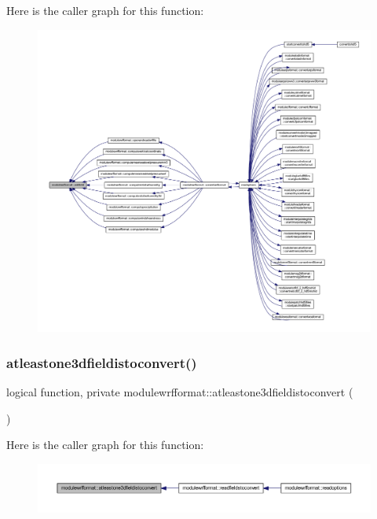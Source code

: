 Here is the caller graph for this function\+:\nopagebreak
\begin{figure}[H]
\begin{center}
\leavevmode
\includegraphics[width=350pt]{namespacemodulewrfformat_a4fec880c8102aff05f702538868fa928_icgraph}
\end{center}
\end{figure}
\mbox{\label{namespacemodulewrfformat_a84c66dd2bcabd5f772f74e52544536f7}} 
\subsubsection{\texorpdfstring{atleastone3dfieldistoconvert()}{atleastone3dfieldistoconvert()}}
{\footnotesize\ttfamily logical function, private modulewrfformat\+::atleastone3dfieldistoconvert (\begin{DoxyParamCaption}{ }\end{DoxyParamCaption})\hspace{0.3cm}{\ttfamily [private]}}

Here is the caller graph for this function\+:\nopagebreak
\begin{figure}[H]
\begin{center}
\leavevmode
\includegraphics[width=350pt]{namespacemodulewrfformat_a84c66dd2bcabd5f772f74e52544536f7_icgraph}
\end{center}
\end{figure}
\mbox{\label{namespacemodulewrfformat_a28558eb5842cfa6977bae48d0fd73c4e}} 
